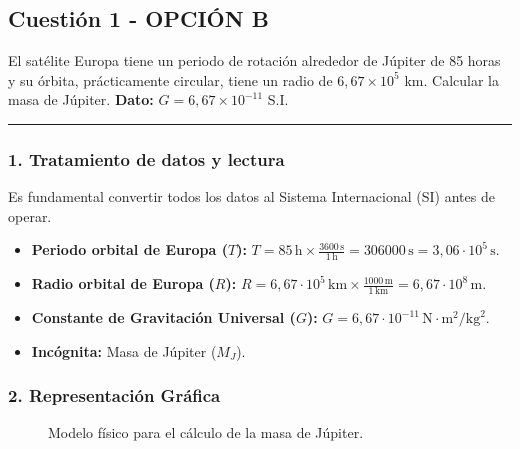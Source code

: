 \newpage

\subsection{Cuestión 1 - OPCIÓN B}
\label{subsec:1B_2001_sep_ext}

\begin{cajaenunciado}
El satélite Europa tiene un periodo de rotación alrededor de Júpiter de 85 horas y su órbita, prácticamente circular, tiene un radio de $6,67\times10^5$ km. Calcular la masa de Júpiter.
\textbf{Dato:} $G=6,67\times10^{-11}$ S.I.
\end{cajaenunciado}
\hrule

\subsubsection*{1. Tratamiento de datos y lectura}
Es fundamental convertir todos los datos al Sistema Internacional (SI) antes de operar.
\begin{itemize}
    \item \textbf{Periodo orbital de Europa ($T$):} $T = 85 \, \text{h} \times \frac{3600 \, \text{s}}{1 \, \text{h}} = 306000 \, \text{s} = 3,06 \cdot 10^5 \, \text{s}$.
    \item \textbf{Radio orbital de Europa ($R$):} $R = 6,67 \cdot 10^5 \, \text{km} \times \frac{1000 \, \text{m}}{1 \, \text{km}} = 6,67 \cdot 10^8 \, \text{m}$.
    \item \textbf{Constante de Gravitación Universal ($G$):} $G = 6,67 \cdot 10^{-11} \, \text{N}\cdot\text{m}^2/\text{kg}^2$.
    \item \textbf{Incógnita:} Masa de Júpiter ($M_J$).
\end{itemize}

\subsubsection*{2. Representación Gráfica}
\begin{figure}[H]
    \centering
    \caption{Modelo físico para el cálculo de la masa de Júpiter.}
\end{figure}

